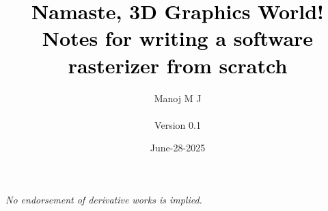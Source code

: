 \documentclass[openany,a4paper,8pt]{book}
\begin{document}
\title{
    \textcolor{black}{Namaste, 3D Graphics World!} \\
    \large \textnormal{\textcolor{black}{Notes for writing a software rasterizer from scratch}}
}
\author{Manoj M J \\ \\Version 0.1 \\}
\date{June-28-2025}


\maketitle

\vspace*{-4em}
\doclicenseThis

\vspace{1em}

\noindent
\textit{No endorsement of derivative works is implied.}

\clearpage


\tableofcontents
\newpage

\mainmatter
{}














\end{document}
